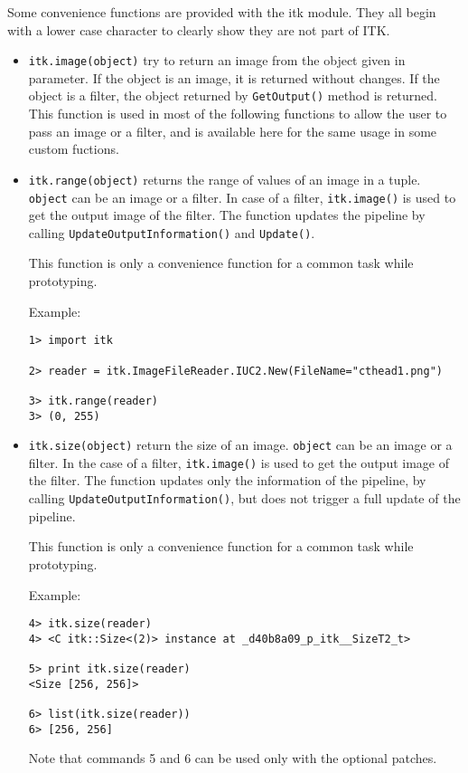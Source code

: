 \documentclass{InsightArticle}
\begin{document}
Some convenience functions are provided with the itk module. They all begin with a lower
case character to clearly show they are not part of ITK.
\begin{itemize}
  \item \verb$itk.image(object)$ try to return an image from the object given in
parameter. If the object is an image, it is returned without changes. If the object
is a filter, the object returned by \verb$GetOutput()$ method is returned.
This function is used in most of the following functions to allow the user to
pass an image or a filter, and is available here for the same usage in some custom
fuctions.

  \item \verb$itk.range(object)$ returns the range of values of an image in a tuple.
\verb$object$ can be an image or a filter. In case of a filter, \verb$itk.image()$ is used
to get the output image of the filter. The function updates the pipeline by calling
\verb$UpdateOutputInformation()$ and \verb$Update()$.

This function is only a convenience function for a common task while prototyping.

Example:
\begin{verbatim}
1> import itk

2> reader = itk.ImageFileReader.IUC2.New(FileName="cthead1.png")

3> itk.range(reader)
3> (0, 255)
\end{verbatim}


  \item \verb$itk.size(object)$ return the size of an image.
\verb$object$ can be an image or a filter. In the case of a filter, \verb$itk.image()$ is used
to get the output image of the filter. The function updates only the information of the
pipeline, by calling \verb$UpdateOutputInformation()$, but does not trigger a full update
of the pipeline.

This function is only a convenience function for a common task while prototyping.

Example:
\begin{verbatim}
4> itk.size(reader)
4> <C itk::Size<(2)> instance at _d40b8a09_p_itk__SizeT2_t>

5> print itk.size(reader)
<Size [256, 256]>

6> list(itk.size(reader))
6> [256, 256]
\end{verbatim}
Note that commands 5 and 6 can be used only with the optional patches.


\end{itemize}
\end{document}
